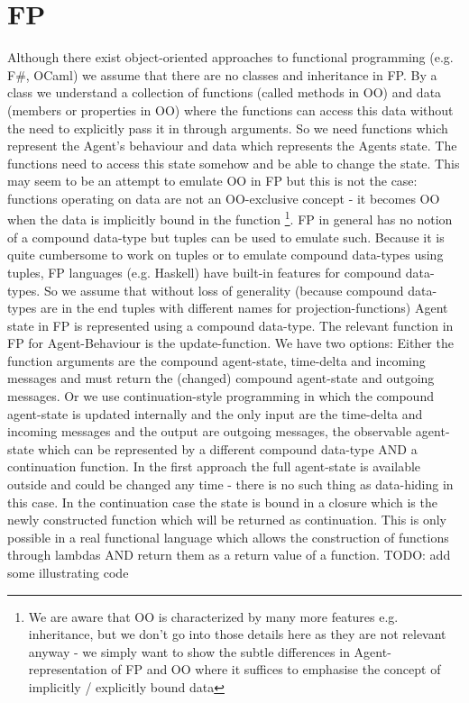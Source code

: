 \section{FP}
Although there exist object-oriented approaches to functional programming (e.g. F\#, OCaml) we assume that there are no classes and inheritance in FP. By a class we understand a collection of functions (called methods in OO) and data (members or properties in OO) where the functions can access this data without the need to explicitly pass it in through arguments.
So we need functions which represent the Agent's behaviour and data which represents the Agents state. The functions need to access this state somehow and be able to change the state. This may seem to be an attempt to emulate OO in FP but this is not the case: functions operating on data are not an OO-exclusive concept - it becomes OO when the data is implicitly bound in the function \footnote{We are aware that OO is characterized by many more features e.g. inheritance, but we don't go into those details here as they are not relevant anyway - we simply want to show the subtle differences in Agent-representation of FP and OO where it suffices to emphasise the concept of implicitly / explicitly bound data}.
FP in general has no notion of a compound data-type but tuples can be used to emulate such. Because it is quite cumbersome to work on tuples or to emulate compound data-types using tuples, FP languages (e.g. Haskell) have built-in features for compound data-types. So we assume that without loss of generality (because compound data-types are in the end tuples with different names for projection-functions) Agent state in FP is represented using a compound data-type.
The relevant function in FP for Agent-Behaviour is the update-function. We have two options:
Either the function arguments are the compound agent-state, time-delta and incoming messages and must return the (changed) compound agent-state and outgoing messages.
Or we use continuation-style programming in which the compound agent-state is updated internally and the only input are the time-delta and incoming messages and the output are outgoing messages, the observable agent-state which can be represented by a different compound data-type AND a continuation function.
In the first approach the full agent-state is available outside and could be changed any time - there is no such thing as data-hiding in this case. In the continuation case the state is bound in a closure which is the newly constructed function which will be returned as continuation. This is only possible in a real functional language which allows the construction of functions through lambdas AND return them as a return value of a function. TODO: add some illustrating code
